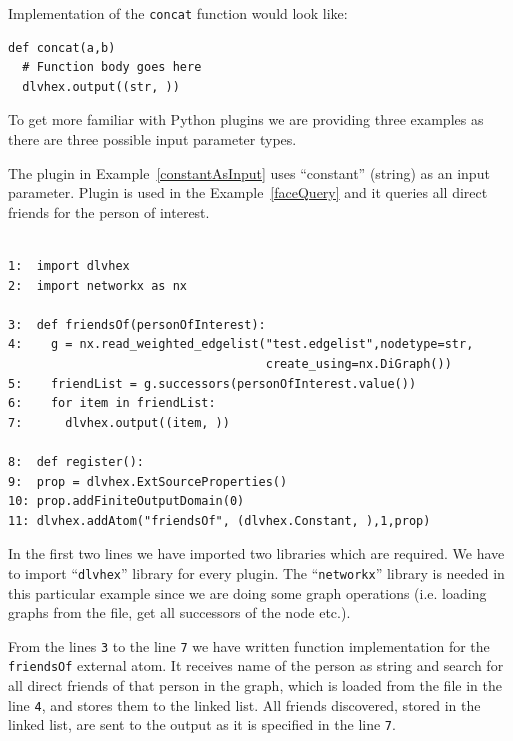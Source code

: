 \documentclass[14pt,a4paper, titlepage]{article}
\begin{document}
Implementation of the \verb+concat+ function would look like:
\begin{verbatim}
def concat(a,b)
  # Function body goes here
  dlvhex.output((str, ))
\end{verbatim} 
To get more familiar with Python plugins we are providing three examples as there are three possible input parameter types.

The plugin in Example~\ref{constantAsInput} uses ``constant'' (string) as an input parameter. Plugin is used in the Example~\ref{faceQuery} and it queries all direct friends for the person of interest.
\begin{exmp}
\label{constantAsInput}
\begin{verbatim}

1:  import dlvhex
2:  import networkx as nx

3:  def friendsOf(personOfInterest):
4:    g = nx.read_weighted_edgelist("test.edgelist",nodetype=str,
                                    create_using=nx.DiGraph())
5:    friendList = g.successors(personOfInterest.value())
6:    for item in friendList:
7:      dlvhex.output((item, ))

8:  def register():
9:  prop = dlvhex.ExtSourceProperties()
10: prop.addFiniteOutputDomain(0)
11: dlvhex.addAtom("friendsOf", (dlvhex.Constant, ),1,prop)
\end{verbatim}
\end{exmp}

In the first two lines we have imported two libraries which 
are required. We have to import ``\verb+dlvhex+'' 
library for every plugin. The ``\verb+networkx+'' 
library is needed in this particular example since we are 
doing some graph operations (i.e. loading graphs from the file, get all successors of the node etc.). 

From the lines \verb+3+ to the line \verb+7+ we have written function 
implementation for the \verb+friendsOf+ external atom. 
It receives name of the person as string and search for all 
direct friends of that person in the graph, which is loaded from the file in the line \verb+4+, and stores them to the linked 
list. All friends discovered, stored in the linked list, are sent to the output as it is specified in the line \verb+7+. 
\end{document}
